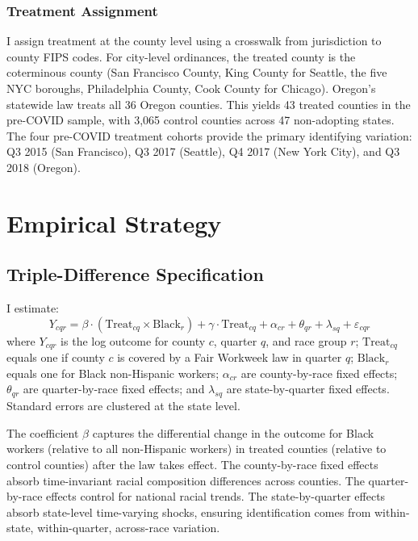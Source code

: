 \documentclass[12pt]{article}
\begin{document}
\subsubsection*{Treatment Assignment} I assign treatment at the county level using a crosswalk from jurisdiction to county FIPS codes. For city-level ordinances, the treated county is the coterminous county (San Francisco County, King County for Seattle, the five NYC boroughs, Philadelphia County, Cook County for Chicago). Oregon's statewide law treats all 36 Oregon counties. This yields 43 treated counties in the pre-COVID sample, with 3,065 control counties across 47 non-adopting states. The four pre-COVID treatment cohorts provide the primary identifying variation: Q3 2015 (San Francisco), Q3 2017 (Seattle), Q4 2017 (New York City), and Q3 2018 (Oregon).




\section{Empirical Strategy}

\subsection{Triple-Difference Specification}

I estimate:
\begin{equation}
\label{eq:ddd}
Y_{cqr} = \beta \cdot (\text{Treat}_{cq} \times \text{Black}_r) + \gamma \cdot \text{Treat}_{cq} + \alpha_{cr} + \theta_{qr} + \lambda_{sq} + \varepsilon_{cqr}
\end{equation}
where $Y_{cqr}$ is the log outcome for county $c$, quarter $q$, and race group $r$; $\text{Treat}_{cq}$ equals one if county $c$ is covered by a Fair Workweek law in quarter $q$; $\text{Black}_r$ equals one for Black non-Hispanic workers; $\alpha_{cr}$ are county-by-race fixed effects; $\theta_{qr}$ are quarter-by-race fixed effects; and $\lambda_{sq}$ are state-by-quarter fixed effects. Standard errors are clustered at the state level.

The coefficient $\beta$ captures the differential change in the outcome for Black workers (relative to all non-Hispanic workers) in treated counties (relative to control counties) after the law takes effect. The county-by-race fixed effects absorb time-invariant racial composition differences across counties. The quarter-by-race effects control for national racial trends. The state-by-quarter effects absorb state-level time-varying shocks, ensuring identification comes from within-state, within-quarter, across-race variation.
\end{document}
